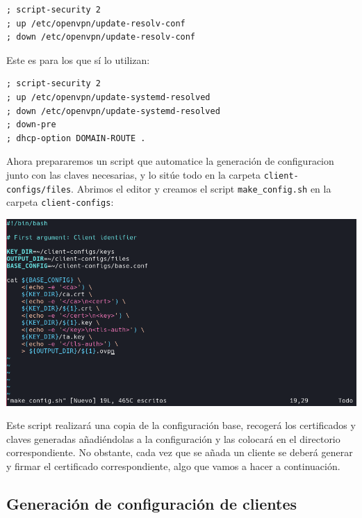 \documentclass[11pt,a4paper]{article}
\begin{document}
\begin{lstlisting}
; script-security 2
; up /etc/openvpn/update-resolv-conf
; down /etc/openvpn/update-resolv-conf
\end{lstlisting}

\medskip

Este es para los que sí lo utilizan:

\begin{lstlisting}
; script-security 2
; up /etc/openvpn/update-systemd-resolved
; down /etc/openvpn/update-systemd-resolved
; down-pre
; dhcp-option DOMAIN-ROUTE .
\end{lstlisting}

\bigskip

Ahora prepararemos un script que automatice la generación de configuracion junto con las claves necesarias, y lo sitúe todo en la carpeta \texttt{client-configs/files}. Abrimos el editor y creamos el script \texttt{make\_config.sh} en la carpeta \texttt{client-configs}:

\medskip

\begin{center}
\includegraphics[scale=0.4]{make-config.png}
\end{center}

\medskip

Este script realizará una copia de la configuración base, recogerá los certificados y claves generadas añadiéndolas a la configuración y las colocará en el directorio correspondiente. No obstante, cada vez que se añada un cliente se deberá generar y firmar el certificado correspondiente, algo que vamos a hacer a continuación.

\subsection{Generación de configuración de clientes}
\end{document}
